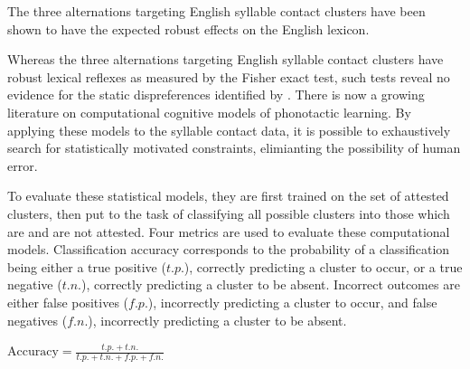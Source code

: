 The three alternations targeting English syllable contact clusters have been shown to have the expected robust effects on the English lexicon. 


Whereas the three alternations targeting English syllable contact clusters have robust lexical reflexes as measured by the Fisher exact test, such tests reveal no evidence for the static dispreferences identified by \citeauthor{Pierrehumbert1994}. There is now a growing literature on computational cognitive models of phonotactic learning. By applying these models to the syllable contact data, it is possible to exhaustively search for statistically motivated constraints, elimianting the possibility of human error. 

To evaluate these statistical models, they are first trained on the set of attested clusters, then put to the task of classifying all possible clusters into those which are and are not attested. Four metrics are used to evaluate these computational models. Classification accuracy corresponds to the probability of a classification being either a true positive ($t.p.$), correctly predicting a cluster to occur, or a true negative ($t.n.$), correctly predicting a cluster to be absent. Incorrect outcomes are either false positives ($f.p.$), incorrectly predicting a cluster to occur, and false negatives ($f.n.$), incorrectly predicting a cluster to be absent. 


\begin{unlabeledexample}
$\displaystyle \textrm{Accuracy} = \frac{t.p. + t.n.}{t.p. + t.n. + f.p. + f.n.}$
\end{unlabeledexample}

